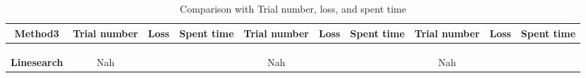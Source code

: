 \begin{table}[htbp]
\begin{tabular}{c|c|c|c|c|c|c|c|c|c}
\textbf{Method3}
& Trial number & Loss & Spent time
& Trial number & Loss & Spent time
& Trial number & Loss & Spent time \\
\hline
& & & & & & & & & \\
\hline
& & & & & & & & & \\
\hline
& & & & & & & & & \\
\hline
\textbf{Linesearch}
& Nah & & 
& Nah & & 
& Nah & & \\
\hline
\end{tabular}
\caption{Comparison with Trial number, loss, and spent time}
\end{table}
